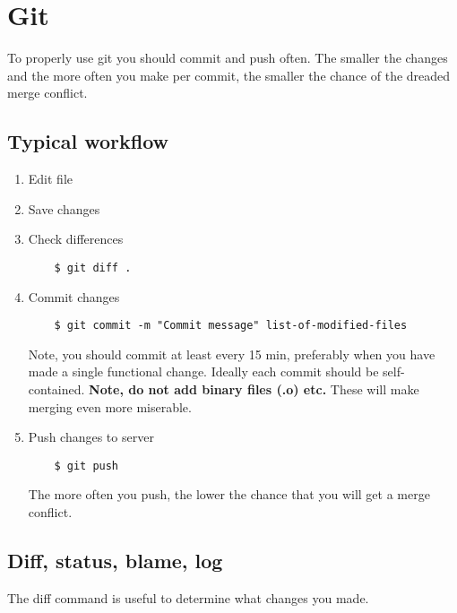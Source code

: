 \chapter{Git}
\label{git}

To properly use git you should commit and push often. The smaller the
changes and the more often you make per commit, the smaller the chance
of the dreaded merge conflict.


\section{Typical workflow}

\begin{enumerate}
\item Edit file

\item Save changes

\item Check differences

\begin{verbatim}
    $ git diff .
\end{verbatim}

\item Commit changes

\begin{verbatim}
    $ git commit -m "Commit message" list-of-modified-files
\end{verbatim}

Note, you should commit at least every 15 min, preferably when you
have made a single functional change.  Ideally each commit should be
self-contained.  \textbf{Note, do not add binary files (.o) etc.}
These will make merging even more miserable.

\item Push changes to server

\begin{verbatim}
    $ git push
\end{verbatim}

The more often you push, the lower the chance that you will get a
merge conflict.

\end{enumerate}


\section{Diff, status, blame, log}

The diff command is useful to determine what changes you made.

